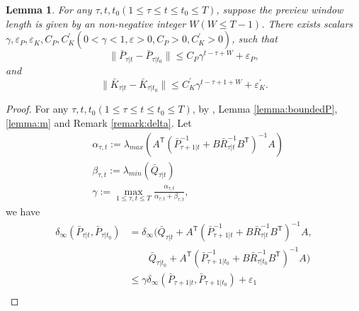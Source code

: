 \documentclass[letterpaper, 10 pt, conference]{ieeeconf}  %
\newcommand{\transpose}{\mathsf{T}}
\newtheorem{lemma}{Lemma}
\begin{document}
\begin{lemma}\label{lemma:boundedPK}
    For any $\tau,t,t_{0}(1\leq \tau\leq t\leq t_{0}\leq T)$, suppose the preview window length is given by an non-negative integer $W(W\leq T-1)$. There exists scalars $\gamma,\varepsilon_{P},\varepsilon_{K},C_{P},C_{K}^{'}(0<\gamma<1,\varepsilon>0,C_{P}>0,C_{K}^{'}>0)$, such that
    \begin{equation}
        \|\bar{P}_{\tau|t}-\bar{P}_{\tau|t_{0}}\| \leq C_{P}\gamma^{t-\tau+W}+\varepsilon_{P},
    \end{equation}
    and
    \begin{equation}
        \|\bar{K}_{\tau|t}-\bar{K}_{\tau|t_{0}}\| \leq C_{K}^{'}\gamma^{t-\tau+1+W}+\varepsilon_{K}^{'}.
    \end{equation}
\end{lemma}
\begin{proof}
     For any $\tau,t,t_{0}(1\leq \tau\leq t\leq t_{0}\leq T)$, by \cite[Lemma D.2]{krauth_finite-time_2019}, Lemma \ref{lemma:boundedP}, \ref{lemma:m} and Remark \ref{remark:delta}. 
     Let
     \begin{align*}
        &\alpha_{\tau,t} := \lambda_{max}(A^{\transpose}(\bar{P}_{\tau+1|t}^{-1}+B\bar{R}_{\tau|t}^{-1}B^{\transpose})^{-1}A)\\
        &\beta_{\tau,t} := \lambda_{min}(\bar{Q}_{\tau|t})\\ 
        &\gamma := \max_{1\leq \tau,t \leq T} \frac{\alpha_{\tau,t}}{\alpha_{\tau,t}+\beta_{\tau,t}}, 
     \end{align*}
     we have
    \begin{align*}
        \delta_{\infty}(\bar{P}_{\tau|t},\bar{P}_{\tau|t_{0}}) &= \delta_{\infty}(\bar{Q}_{\tau|t}+A^{\transpose}(\bar{P}_{\tau+1|t}^{-1}+B\bar{R}_{\tau|t}^{-1}B^{\transpose})^{-1}A,\\
        & \qquad \bar{Q}_{\tau|t_{0}}+A^{\transpose}(\bar{P}_{\tau+1|t_{0}}^{-1}+B\bar{R}_{\tau|t_{0}}^{-1}B^{\transpose})^{-1}A)\\
        &\leq \gamma\delta_{\infty}(\bar{P}_{\tau+1|t},\bar{P}_{\tau+1|t_{0}}) + \varepsilon_{1}\\

\end{align*}
\end{proof}
\end{document}
